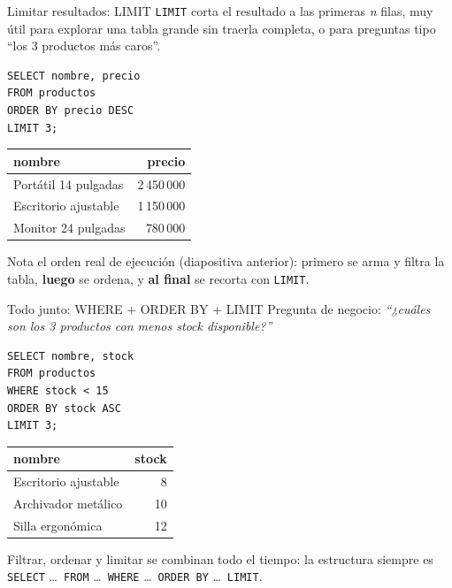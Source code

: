 \documentclass[aspectratio=169,11pt]{beamer}
\begin{document}
\begin{frame}[fragile]{Limitar resultados: LIMIT}
  \small
  \texttt{LIMIT} corta el resultado a las primeras \textit{n} filas, muy
  útil para explorar una tabla grande sin traerla completa, o para
  preguntas tipo ``los 3 productos más caros''.
  \begin{lstlisting}
SELECT nombre, precio
FROM productos
ORDER BY precio DESC
LIMIT 3;
  \end{lstlisting}
  \begin{center}
    \small
    \begin{tabular}{lr}
      \toprule
      \textbf{nombre} & \textbf{precio} \\
      \midrule
      Portátil 14 pulgadas & 2\,450\,000 \\
      Escritorio ajustable & 1\,150\,000 \\
      Monitor 24 pulgadas & 780\,000 \\
      \bottomrule
    \end{tabular}
  \end{center}
  \small Nota el orden real de ejecución (diapositiva anterior): primero
  se arma y filtra la tabla, \textbf{luego} se ordena, y \textbf{al final}
  se recorta con \texttt{LIMIT}.
\end{frame}

\begin{frame}[fragile]{Todo junto: WHERE + ORDER BY + LIMIT}
  \small
  Pregunta de negocio: \textit{``¿cuáles son los 3 productos con menos
  stock disponible?''}
  \begin{lstlisting}
SELECT nombre, stock
FROM productos
WHERE stock < 15
ORDER BY stock ASC
LIMIT 3;
  \end{lstlisting}
  \begin{center}
    \small
    \begin{tabular}{lr}
      \toprule
      \textbf{nombre} & \textbf{stock} \\
      \midrule
      Escritorio ajustable & 8 \\
      Archivador metálico & 10 \\
      Silla ergonómica & 12 \\
      \bottomrule
    \end{tabular}
  \end{center}
  \small Filtrar, ordenar y limitar se combinan todo el tiempo: la
  estructura siempre es \texttt{SELECT} \dots\ \texttt{FROM} \dots\
  \texttt{WHERE} \dots\ \texttt{ORDER BY} \dots\ \texttt{LIMIT}.
\end{frame}
\end{document}
